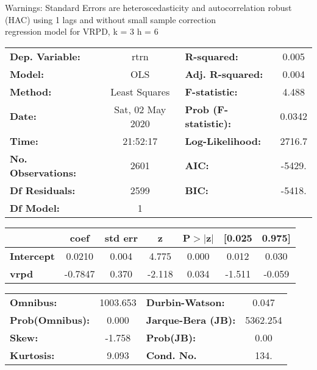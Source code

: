 Warnings: \newline
 [1] Standard Errors are heteroscedasticity and autocorrelation robust (HAC) using 1 lags and without small sample correction\\ 

regression model for VRPD, k = 3 h = 6\begin{center}
\begin{tabular}{lclc}
\toprule
\textbf{Dep. Variable:}    &       rtrn       & \textbf{  R-squared:         } &     0.005   \\
\textbf{Model:}            &       OLS        & \textbf{  Adj. R-squared:    } &     0.004   \\
\textbf{Method:}           &  Least Squares   & \textbf{  F-statistic:       } &     4.488   \\
\textbf{Date:}             & Sat, 02 May 2020 & \textbf{  Prob (F-statistic):} &   0.0342    \\
\textbf{Time:}             &     21:52:17     & \textbf{  Log-Likelihood:    } &    2716.7   \\
\textbf{No. Observations:} &        2601      & \textbf{  AIC:               } &    -5429.   \\
\textbf{Df Residuals:}     &        2599      & \textbf{  BIC:               } &    -5418.   \\
\textbf{Df Model:}         &           1      & \textbf{                     } &             \\
\bottomrule
\end{tabular}
\begin{tabular}{lcccccc}
                   & \textbf{coef} & \textbf{std err} & \textbf{z} & \textbf{P$> |$z$|$} & \textbf{[0.025} & \textbf{0.975]}  \\
\midrule
\textbf{Intercept} &       0.0210  &        0.004     &     4.775  &         0.000        &        0.012    &        0.030     \\
\textbf{vrpd}      &      -0.7847  &        0.370     &    -2.118  &         0.034        &       -1.511    &       -0.059     \\
\bottomrule
\end{tabular}
\begin{tabular}{lclc}
\textbf{Omnibus:}       & 1003.653 & \textbf{  Durbin-Watson:     } &    0.047  \\
\textbf{Prob(Omnibus):} &   0.000  & \textbf{  Jarque-Bera (JB):  } & 5362.254  \\
\textbf{Skew:}          &  -1.758  & \textbf{  Prob(JB):          } &     0.00  \\
\textbf{Kurtosis:}      &   9.093  & \textbf{  Cond. No.          } &     134.  \\
\bottomrule
\end{tabular}
\end{center}

